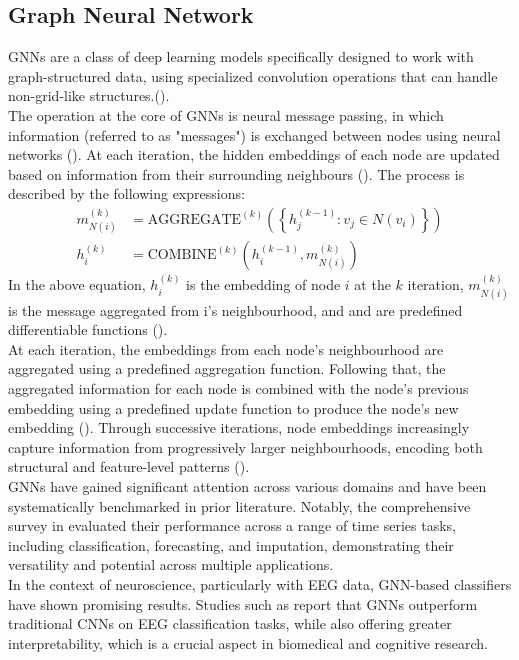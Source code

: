 \subsection{Graph Neural Network}
GNNs are a class of deep learning models specifically designed to work with graph-structured data, using specialized convolution operations that can handle non-grid-like structures.(\cite{GNNBook}).
\vspace{0.5em}\\
The operation at the core of GNNs is neural message passing, in which information (referred to as "messages") is exchanged between nodes using neural networks (\cite{gilmer2017}).
At each iteration, the hidden embeddings of each node are updated based on information from their surrounding neighbours (\cite{GNNBook}).
The process is described by the following expressions: \\
\begin{equation*}
\begin{aligned}
m_{N(i)}^{(k)} &= \text{AGGREGATE}^{(k)}\left( \left\{ h_j^{(k-1)} : v_j \in N(v_i) \right\} \right) \\
h_i^{(k)} &= \text{COMBINE}^{(k)}\left( h_i^{(k-1)}, m_{N(i)}^{(k)} \right)
\end{aligned}
\end{equation*}
In the above equation, $h_i^{(k)}$ is the embedding of node $i$ at the $k$ iteration, $m_{N(i)}^{(k)}$ is the message aggregated from i's neighbourhood, and  and  are predefined differentiable functions (\cite{GNNBook}).
\vspace{0.5em}\\
At each iteration, the embeddings from each node's neighbourhood are aggregated using a predefined aggregation function. Following that, the aggregated information for each node is combined with the node's previous embedding using a predefined update function to produce the node's new embedding (\cite{GNNBook}).
Through successive iterations, node embeddings increasingly capture information from progressively larger neighbourhoods, encoding both structural and feature-level patterns (\cite{GNNBook}).
\vspace{0.5em}\\
GNNs have gained significant attention across various domains and have been systematically benchmarked in prior literature. Notably, the comprehensive survey in \cite{NNSurvey} evaluated their performance across a range of time series tasks, including classification, forecasting, and imputation, demonstrating their versatility and potential across multiple applications.
\vspace{0.5em}\\
In the context of neuroscience, particularly with EEG data, GNN-based classifiers have shown promising results. Studies such as \cite{gnn_for_eeg} report that GNNs outperform traditional CNNs on EEG classification tasks, while also offering greater interpretability, which is a crucial aspect in biomedical and cognitive research.
